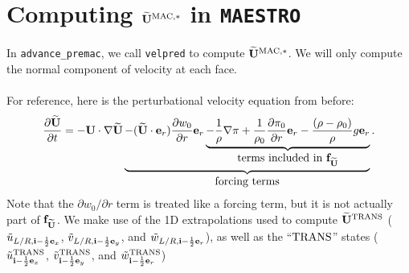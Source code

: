 \section{Computing $\widetilde{{\bf U}}^{\rm MAC,*}$ in {\tt MAESTRO}}
In {\tt advance\_premac}, we call {\tt velpred} to compute
$\widetilde{{\bf U}}^{\rm MAC,*}$.  We will only compute the normal component of
velocity at each face.\\ \\
For reference, here is the perturbational velocity equation from before:
\begin{equation}
\frac{\partial\widetilde{{\bf U}}}{\partial t} = -{\bf U}\cdot\nabla\widetilde{{\bf U}} \underbrace{- (\widetilde{{\bf U}}\cdot{\bf e}_r)\frac{\partial w_0}{\partial r}{\bf e}_r \underbrace{- \frac{1}{\rho}\nabla\pi + \frac{1}{\rho_0}\frac{\partial\pi_0}{\partial r}{\bf e}_r - \frac{(\rho-\rho_0)}{\rho}g{\bf e}_r}_{\hbox{terms included in ${\bf f}_{\widetilde{{\bf U}}}$}}}_{\hbox{forcing terms}}.
\end{equation}
Note that the $\partial w_0/\partial r$ term is treated like a forcing
term, but it is not actually part of ${\bf f}_{\widetilde{{\bf U}}}$.  We make use of the 1D
extrapolations used to compute $\widetilde{{\bf U}}^{\rm TRANS}$ 
($\tilde{u}_{L/R,{\bf i}-\frac{1}{2}{\bf e}_x}$, $\tilde{v}_{L/R,{\bf i}-\frac{1}{2}{\bf e}_y}$, 
and $\tilde{w}_{L/R,{\bf i}-\frac{1}{2}{\bf e}_r}$), as well as the ``$\rm TRANS$'' states
($\tilde{u}_{{\bf i}-\frac{1}{2}{\bf e}_x}^{\rm TRANS}$, $\tilde{v}_{{\bf i}-\frac{1}{2}{\bf e}_y}^{\rm TRANS}$, 
and $\tilde{w}_{{\bf i}-\frac{1}{2}{\bf e}_r}^{\rm TRANS}$)

\newpage

